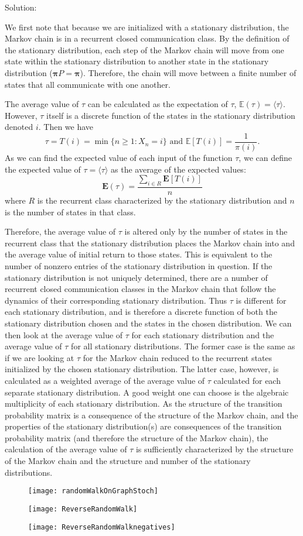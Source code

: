 \documentclass[12pt]{article}
\numberwithin{equation}{section}
\begin{document}
\begin{enumerate}
Solution:

 We first note that because we are initialized with a stationary distribution, the Markov chain is in a recurrent closed communication class. By the definition of the stationary distribution, each step of the Markov chain will move from one state within the stationary distribution to another state in the stationary distribution ($\mathbf{\pi}P=\mathbf{\pi}$). Therefore, the chain will move between a finite number of states that all communicate with one another.

 The average value of $\tau$ can be calculated as the expectation of $\tau$, $\mathbb{E}(\tau)=\langle\tau\rangle$. However, $\tau$ itself is a discrete function of the states in the stationary distribution denoted $i$. Then we have
 $$\tau=T(i)=\min\{n\geq1 :X_n=i\}\text{ and }\mathbb{E}[T(i)]=\frac{1}{\pi(i)}.$$
 As we can find the expected value of each input of the function $\tau$, we can define the expected value of $\tau=\langle\tau\rangle$ as the average of the expected values:
 $$\mathbf{E}(\tau)=\frac{\sum_{i\in R}\mathbf{E}[T(i)]}{n}$$
 where $R$ is the recurrent class characterized by the stationary distribution and $n$ is the number of states in that class.

 Therefore, the average value of $\tau$ is altered only by the number of states in the recurrent class that the stationary distribution places the Markov chain into and the average value of initial return to those states. This is equivalent to the number of nonzero entries of the stationary distribution in question. If the stationary distribution is not uniquely determined, there are a number of recurrent closed communication classes in the Markov chain that follow the dynamics of their corresponding stationary distribution. Thus $\tau$ is different for each stationary distribution, and is therefore a discrete function of both the stationary distribution chosen and the states in the chosen distribution. We can then look at the average value of $\tau$ for each stationary distribution and the average value of $\tau$ for all stationary distributions. The former case is the same as if we are looking at $\tau$ for the Markov chain reduced to the recurrent states initialized by the chosen stationary distribution. The latter case, however, is calculated as a weighted average of the average value of $\tau$ calculated for each separate stationary distribution. A good weight one can choose is the algebraic multiplicity of each stationary distribution. As the structure of the transition probability matrix is a consequence of the structure of the Markov chain, and the properties of the stationary distribution(s) are consequences of the transition probability matrix (and therefore the structure of the Markov chain), the calculation of the average value of $\tau$ is sufficiently characterized by the structure of the Markov chain and the structure and number of the stationary distributions.
 \end{enumerate}
 \pagebreak

\begin{figure}[tp]
\texttt{[image: randomWalkOnGraphStoch]}
\end{figure}
\begin{figure}[bp]
\texttt{[image: ReverseRandomWalk]}
\end{figure}
\begin{figure}
\texttt{[image: ReverseRandomWalknegatives]}
\end{figure}
 
\end{document}
